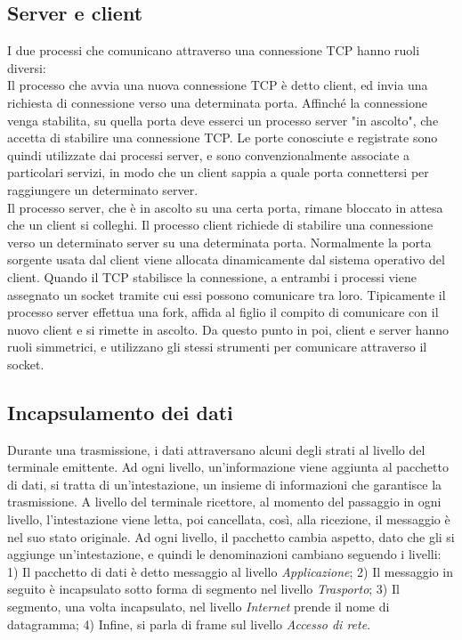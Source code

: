 \documentclass[12pt, a4paper, oneside]{book}
\begin{document}
\subsection{Server e client}
I due processi che comunicano attraverso una connessione TCP hanno ruoli diversi:
\\Il processo che avvia una nuova connessione TCP è detto client, ed invia una richiesta di connessione verso una determinata porta.
Affinché la connessione venga stabilita, su quella porta deve esserci un processo server "in ascolto", che accetta di stabilire una connessione TCP.
Le porte conosciute e registrate sono quindi utilizzate dai processi server, e sono convenzionalmente associate a particolari servizi, in modo che un client sappia a quale porta connettersi per raggiungere un determinato server.
\\Il processo server, che è in ascolto su una certa porta, rimane bloccato in attesa che un client si colleghi. Il processo client richiede di stabilire una connessione verso un determinato server su una determinata porta. Normalmente la porta sorgente usata dal client viene allocata dinamicamente dal sistema operativo del client. Quando il TCP stabilisce la connessione, a entrambi i processi viene assegnato un socket tramite cui essi possono comunicare tra loro. Tipicamente il processo server effettua una fork, affida al figlio il compito di comunicare con il nuovo client e si rimette in ascolto. Da questo punto in poi, client e server hanno ruoli simmetrici, e utilizzano gli stessi strumenti per comunicare attraverso il socket.
\subsection{Incapsulamento dei dati}
Durante una trasmissione, i dati attraversano alcuni degli strati al livello del terminale emittente. Ad ogni livello, un'informazione viene aggiunta al pacchetto di dati, si tratta di un'intestazione, un insieme di informazioni che garantisce la trasmissione. A livello del terminale ricettore, al momento del passaggio in ogni livello, l'intestazione viene letta, poi cancellata, così, alla ricezione, il messaggio è nel suo stato originale. Ad ogni livello, il pacchetto cambia aspetto, dato che gli si aggiunge un'intestazione, e quindi le denominazioni cambiano seguendo i livelli: 1) Il pacchetto di dati è detto messaggio al livello \textit{Applicazione}; 2) Il messaggio in seguito è incapsulato sotto forma di segmento nel livello \textit{Trasporto}; 3) Il segmento, una volta incapsulato, nel livello \textit{Internet} prende il nome di datagramma; 4) Infine, si parla di frame sul livello \textit{Accesso di rete}.
\end{document}
